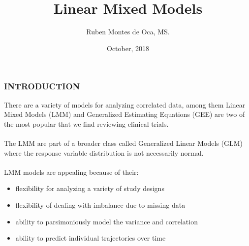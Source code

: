 \documentclass[mathserif]{beamer}
\begin{document}
	\title{Linear Mixed Models}  
	\author{Ruben Montes de Oca, MS.}
	\date{October, 2018} 

\frame{\titlepage} 
\begin{frame}
	\frametitle{INTRODUCTION}
	
There are a variety of models for analyzing correlated data, among them Linear Mixed Models (LMM) and 
Generalized Estimating Equations (GEE) are two of the most popular that we find reviewing clinical trials. \\ \\

The LMM are part of a broader class called Generalized Linear Models (GLM) where the response variable 
distribution is not necessarily normal. \\ \\
	
LMM models are appealing because of their:

\begin{itemize}
\item flexibility for analyzing a variety of study designs
\item flexibility of dealing with imbalance due to missing data
\item ability to parsimoniously model the variance and correlation
\item ability to predict individual trajectories over time
\end{itemize}


\end{frame}

\end{document}
